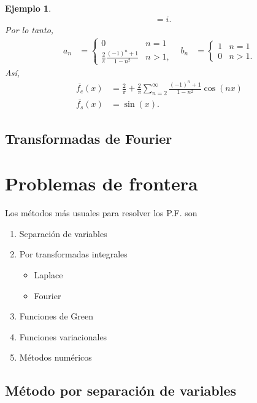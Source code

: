 \documentclass[11pt,letterpaper]{report}
\newtheorem{example}[defn]{Ejemplo}
\newcommand\<{\langle}
\renewcommand\>{\rangle}
\begin{document}
\begin{example}
\begin{align*}
    &=i.
  \end{align*}
  Por lo tanto,
  \begin{align*}
    a_n
    &=
    \begin{cases}
      0 & n=1 \\
      \frac{2}{\pi}\frac{(-1)^{n}+1}{1-n^{2}} & n>1,
    \end{cases}
    &
    b_n
    &=
    \begin{cases}
      1 & n=1 \\
      0 & n>1.
    \end{cases}
  \end{align*}
  Así,
  \begin{align*}
    \overline{f_c}(x)
    &=
    \frac{2}{\pi}
    +
    \frac{2}{\pi}
    \sum_{n=2}^{\infty}\frac{(-1)^{n}+1}{1-n^{2}}\cos(nx) \\
    \overline{f_s}(x)
    &= \sin(x).
  \end{align*}
\end{example}

\section{Transformadas de Fourier}




\chapter{Problemas de frontera} %

Los métodos más usuales para resolver los P.F. son
\begin{enumerate}
  \item Separación de variables
  \item Por transformadas integrales
  \begin{itemize}
    \item   Laplace
    \item Fourier   
  \end{itemize}
  \item Funciones de Green
  \item Funciones variacionales
  \item Métodos numéricos
\end{enumerate}

\section{Método por separación de variables}
\end{document}
